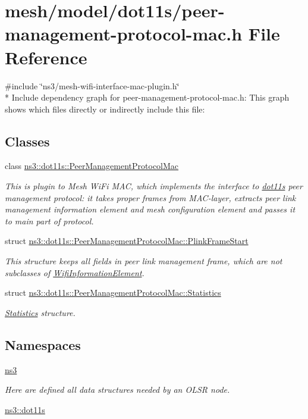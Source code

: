 \hypertarget{peer-management-protocol-mac_8h}{}\section{mesh/model/dot11s/peer-\/management-\/protocol-\/mac.h File Reference}
\label{peer-management-protocol-mac_8h}
{\ttfamily \#include \char`\"{}ns3/mesh-\/wifi-\/interface-\/mac-\/plugin.\+h\char`\"{}}\\*
Include dependency graph for peer-\/management-\/protocol-\/mac.h\+:
This graph shows which files directly or indirectly include this file\+:
\subsection*{Classes}
\begin{DoxyCompactItemize}
\item 
class \hyperlink{classns3_1_1dot11s_1_1PeerManagementProtocolMac}{ns3\+::dot11s\+::\+Peer\+Management\+Protocol\+Mac}
\begin{DoxyCompactList}\small\item\em This is plugin to Mesh Wi\+Fi M\+AC, which implements the interface to \hyperlink{namespacens3_1_1dot11s}{dot11s} peer management protocol\+: it takes proper frames from M\+A\+C-\/layer, extracts peer link management information element and mesh configuration element and passes it to main part of protocol. \end{DoxyCompactList}\item 
struct \hyperlink{structns3_1_1dot11s_1_1PeerManagementProtocolMac_1_1PlinkFrameStart}{ns3\+::dot11s\+::\+Peer\+Management\+Protocol\+Mac\+::\+Plink\+Frame\+Start}
\begin{DoxyCompactList}\small\item\em This structure keeps all fields in peer link management frame, which are not subclasses of \hyperlink{classns3_1_1WifiInformationElement}{Wifi\+Information\+Element}. \end{DoxyCompactList}\item 
struct \hyperlink{structns3_1_1dot11s_1_1PeerManagementProtocolMac_1_1Statistics}{ns3\+::dot11s\+::\+Peer\+Management\+Protocol\+Mac\+::\+Statistics}
\begin{DoxyCompactList}\small\item\em \hyperlink{structns3_1_1dot11s_1_1PeerManagementProtocolMac_1_1Statistics}{Statistics} structure. \end{DoxyCompactList}\end{DoxyCompactItemize}
\subsection*{Namespaces}
\begin{DoxyCompactItemize}
\item 
 \hyperlink{namespacens3}{ns3}
\begin{DoxyCompactList}\small\item\em Here are defined all data structures needed by an O\+L\+SR node. \end{DoxyCompactList}\item 
 \hyperlink{namespacens3_1_1dot11s}{ns3\+::dot11s}
\end{DoxyCompactItemize}
